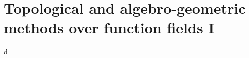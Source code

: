 
\section{Topological and algebro-geometric methods over function fields I}\label{sec:ellenberg-i}





d


